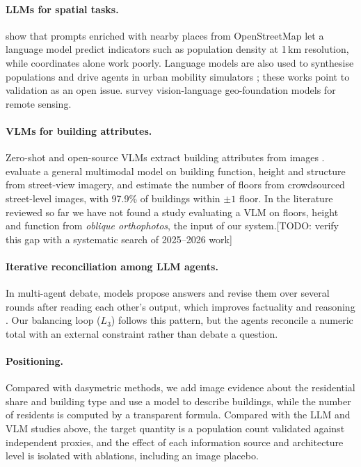 \documentclass[11pt]{article}
\newcommand{\todo}[1]{{\color{red}[TODO: #1]}}
\begin{document}
\paragraph{LLMs for spatial tasks.}
\citet{manvi2024geollm} show that prompts enriched with nearby places from OpenStreetMap let a language model predict indicators such as population density at 1\,km resolution, while coordinates alone work poorly.
Language models are also used to synthesise populations and drive agents in urban mobility simulators \citep{mobiverse2025,gatsim2025,song2025llmmobility}; these works point to validation as an open issue.
\citet{zhou2024vlgfm} survey vision-language geo-foundation models for remote sensing.

\paragraph{VLMs for building attributes.}
Zero-shot and open-source VLMs extract building attributes from images \citep{pan2023zeroshot,openfacades2025}.
\citet{yang2024streetview} evaluate a general multimodal model on building function, height and structure from street-view imagery, and \citet{sun2025floors} estimate the number of floors from crowdsourced street-level images, with 97.9\% of buildings within $\pm 1$ floor.
In the literature reviewed so far we have not found a study evaluating a VLM on floors, height and function from \emph{oblique orthophotos}, the input of our system.\todo{verify this gap with a systematic search of 2025--2026 work}

\paragraph{Iterative reconciliation among LLM agents.}
In multi-agent debate, models propose answers and revise them over several rounds after reading each other's output, which improves factuality and reasoning \citep{du2024debate}.
Our balancing loop ($L_3$) follows this pattern, but the agents reconcile a numeric total with an external constraint rather than debate a question.

\paragraph{Positioning.}
Compared with dasymetric methods, we add image evidence about the residential share and building type and use a model to describe buildings, while the number of residents is computed by a transparent formula.
Compared with the LLM and VLM studies above, the target quantity is a population count validated against independent proxies, and the effect of each information source and architecture level is isolated with ablations, including an image placebo.
\end{document}
